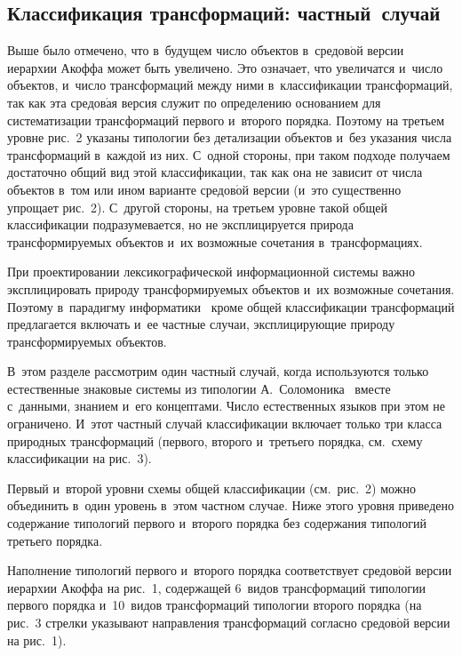 \begin{multicols}{2}
\section{Классификация трансформаций: частный~случай}

  Выше было отмечено, что в~будущем число объектов 
в~средов$\acute{\mbox{о}}$й версии иерархии Акоффа может быть увеличено. 
Это означает, что увеличатся и~чис\-ло объектов, и~чис\-ло трансформаций между 
ними в~классификации трансформаций, так как эта средов$\acute{\mbox{а}}$я 
версия служит по определению основанием для систематизации 
трансформаций первого и~второго порядка. Поэтому на третьем уровне рис.~2 
указаны типологии без детализации объектов и~без указания числа 
трансформаций в~каждой из них. С~одной стороны, при таком подходе 
получаем достаточно общий вид этой классификации, так как она не зависит от 
числа объектов в~том или ином варианте средов$\acute{\mbox{о}}$й версии 
(и~это существенно упрощает рис.~2). С~другой стороны, на третьем уровне 
такой общей классификации подразумевается, но не эксплицируется природа 
трансформируемых объектов и~их возможные сочетания в~трансформациях. 

При проектировании лексикографической информационной системы важно 
эксплицировать природу трансформируемых объектов и~их возможные 
сочетания.
  Поэтому в~парадигму информатики~\cite{30-zac} кроме общей 
классификации трансформаций предлагается включать и~ее частные случаи, 
эксплицирующие природу трансформируемых объектов. 

В~этом разделе 
рассмотрим один частный случай, когда используются только естественные 
знаковые сис\-те\-мы из типологии А.~Соломоника~\cite{25-zac} вместе 
с~данными, знанием и~его концептами. Чис\-ло естественных языков при этом не 
ограничено. И~этот частный случай классификации включает только три 
класса природных трансформаций (первого, второго и~третьего порядка, см.\ 
схему классификации на рис.~3).
  
  Первый и~второй уровни схемы общей классификации (см.\ рис.~2) можно 
объединить в~один уровень в~этом частном случае. Ниже этого уровня 
приведено содержание типологий первого и~второго порядка без содержания 
типологий третьего по\-рядка.




  Наполнение типологий первого и~второго порядка соответствует 
средов$\acute{\mbox{о}}$й версии иерархии Акоффа на рис.~1, содержащей 
6~видов трансформаций типологии первого порядка и~10~видов 
трансформаций типологии второго порядка (на рис.~3 стрелки указывают 
направления трансформаций согласно средов$\acute{\mbox{о}}$й версии на рис.~1).
  

\end{multicols}
